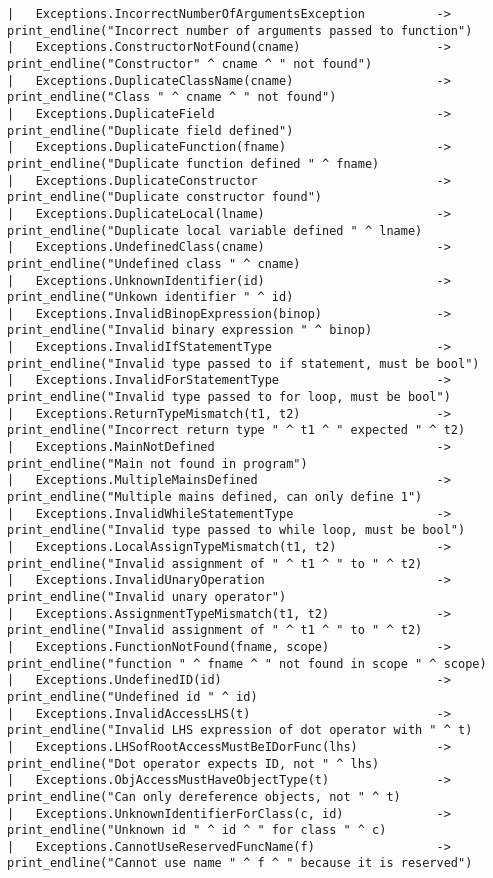 \begin{verbatim}
| 	Exceptions.IncorrectNumberOfArgumentsException 			-> print_endline("Incorrect number of arguments passed to function")
| 	Exceptions.ConstructorNotFound(cname) 					-> print_endline("Constructor" ^ cname ^ " not found")
| 	Exceptions.DuplicateClassName(cname) 					-> print_endline("Class " ^ cname ^ " not found")
| 	Exceptions.DuplicateField 								-> print_endline("Duplicate field defined")
| 	Exceptions.DuplicateFunction(fname) 					-> print_endline("Duplicate function defined " ^ fname)
| 	Exceptions.DuplicateConstructor 						-> print_endline("Duplicate constructor found")
| 	Exceptions.DuplicateLocal(lname) 						-> print_endline("Duplicate local variable defined " ^ lname)
| 	Exceptions.UndefinedClass(cname) 						-> print_endline("Undefined class " ^ cname)
| 	Exceptions.UnknownIdentifier(id) 						-> print_endline("Unkown identifier " ^ id)
| 	Exceptions.InvalidBinopExpression(binop) 				-> print_endline("Invalid binary expression " ^ binop)
| 	Exceptions.InvalidIfStatementType 						-> print_endline("Invalid type passed to if statement, must be bool")
| 	Exceptions.InvalidForStatementType 						-> print_endline("Invalid type passed to for loop, must be bool")
| 	Exceptions.ReturnTypeMismatch(t1, t2)					-> print_endline("Incorrect return type " ^ t1 ^ " expected " ^ t2)
| 	Exceptions.MainNotDefined 								-> print_endline("Main not found in program")
| 	Exceptions.MultipleMainsDefined							-> print_endline("Multiple mains defined, can only define 1")
| 	Exceptions.InvalidWhileStatementType 					-> print_endline("Invalid type passed to while loop, must be bool")
| 	Exceptions.LocalAssignTypeMismatch(t1, t2) 				-> print_endline("Invalid assignment of " ^ t1 ^ " to " ^ t2)
| 	Exceptions.InvalidUnaryOperation 						-> print_endline("Invalid unary operator")
| 	Exceptions.AssignmentTypeMismatch(t1, t2) 				-> print_endline("Invalid assignment of " ^ t1 ^ " to " ^ t2)
| 	Exceptions.FunctionNotFound(fname, scope) 				-> print_endline("function " ^ fname ^ " not found in scope " ^ scope)
| 	Exceptions.UndefinedID(id) 								-> print_endline("Undefined id " ^ id)
| 	Exceptions.InvalidAccessLHS(t) 							-> print_endline("Invalid LHS expression of dot operator with " ^ t)
| 	Exceptions.LHSofRootAccessMustBeIDorFunc(lhs) 			-> print_endline("Dot operator expects ID, not " ^ lhs)
| 	Exceptions.ObjAccessMustHaveObjectType(t) 				-> print_endline("Can only dereference objects, not " ^ t)
| 	Exceptions.UnknownIdentifierForClass(c, id) 			-> print_endline("Unknown id " ^ id ^ " for class " ^ c)
| 	Exceptions.CannotUseReservedFuncName(f) 				-> print_endline("Cannot use name " ^ f ^ " because it is reserved")

\end{verbatim}
